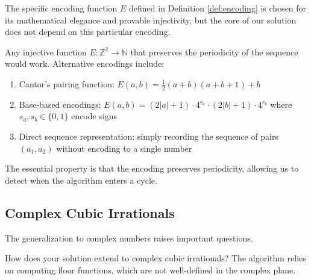 \begin{response}
The specific encoding function $E$ defined in Definition \ref{def:encoding} is chosen for its mathematical elegance and provable injectivity, but the core of our solution does not depend on this particular encoding.

Any injective function $E: \mathbb{Z}^2 \to \mathbb{N}$ that preserves the periodicity of the sequence would work. Alternative encodings include:
\begin{enumerate}
    \item Cantor's pairing function: $E(a,b) = \frac{1}{2}(a+b)(a+b+1) + b$
    \item Base-based encodings: $E(a,b) = (2|a|+1) \cdot 4^{s_a} \cdot (2|b|+1) \cdot 4^{s_b}$ where $s_a, s_b \in \{0,1\}$ encode signs
    \item Direct sequence representation: simply recording the sequence of pairs $(a_1, a_2)$ without encoding to a single number
\end{enumerate}

The essential property is that the encoding preserves periodicity, allowing us to detect when the \HAPD{} algorithm enters a cycle.
\end{response}

\subsection{Complex Cubic Irrationals}

The generalization to complex numbers raises important questions.

\begin{objection}
How does your solution extend to complex cubic irrationals? The \HAPD{} algorithm relies on computing floor functions, which are not well-defined in the complex plane.
\end{objection}

